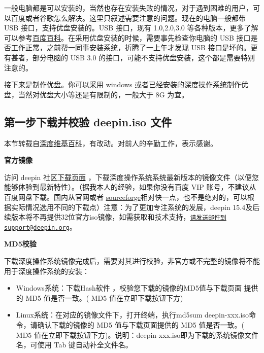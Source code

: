 \documentclass[doctor,openright,twoside]{sjtuthesis}
\providecommand{\tightlist}{%
    \setlength{\itemsep}{0pt}\setlength{\parskip}{0pt}}
\theoremstyle{plain}
\theoremstyle{definition}
\theoremstyle{remark}
\theoremstyle{ocrenumbox}
\theoremstyle{plain}
\begin{document}
一般电脑都是可以安装的，当然也存在安装失败的情况，对于遇到困难的用户，可以百度或者谷歌怎么解决。这里只叙述需要注意的问题。现在的电脑一般都带 USB 接口，支持优盘安装的。USB 接口，现有 1.0,2.0,3.0 等各种版本，更多了解可以参考\href{https://baike.baidu.com/item/USB\%E6\%8E\%A5\%E5\%8F\%A3/493294?fr=aladdin}{百度百科}。在采用优盘安装的时候，需要事先检查你电脑的 USB 接口是否工作正常，之前帮一同事安装系统，折腾了一上午才发现 USB 接口是坏的。更有甚者，部分电脑的 USB 3.0 的接口，可能不支持优盘安装，这个都是需要特别注意的。

接下来是制作优盘。你可以采用 windows 或者已经安装的深度操作系统制作优盘，当然对优盘大小等还是有限制的，一般大于 8G 为宜。

\hypertarget{deepin.iso-}{%
\subsection{第一步下载并校验 deepin.iso 文件}\label{deepin.iso-}}

本节转载自\href{https://wiki.deepin.org/index.php?title=\%E5\%8E\%9F\%E7\%94\%9F\%E5\%AE\%89\%E8\%A3\%85}{深度维基百科}，有改动。对前人的辛勤工作，表示感谢。

\textbf{官方镜像}

访问 deepin 社区\href{https://www.deepin.org/download/}{下载页面} ，下载深度操作系统系统最新版本的镜像文件（以便您能够体验到最新特性）。（据我本人的经验，如果你没有百度 VIP 账号，不建议从百度网盘下载。国内从官网或者 \href{https://sourceforge.net/projects/deepin/}{sourceforge}相对快一点，也不是绝对的，可以根据实际情况选用不同的下载点）注意：为了更加专注系统的发展，deepin 15.4及后续版本将不再提供32位官方iso镜像，如需获取和技术支持，\href{mailto:请发送邮件到support@deepin.org}{\nolinkurl{请发送邮件到support@deepin.org}}。

\textbf{MD5校验}

下载深度操作系统镜像完成后，需要对其进行校验，非官方或不完整的镜像将不能用于深度操作系统的安装：

\begin{itemize}
\tightlist
\item
  Windows系统：下载Hash软件 ，校验您下载的镜像的MD5值与下载页面 提供的 MD5 值是否一致。( MD5 值在立即下载按钮下方)
\item
  Linux系统：在对应的镜像文件下，打开终端，执行md5sum deepin-xxx.iso命令，请确认下载的镜像的 MD5 值与下载页面提供的 MD5 值是否一致。( MD5 值在立即下载按钮下方)。说明：deepin-xxx.iso即为下载的系统镜像文件名，可使用 Tab 键自动补全文件名。
\end{itemize}
\end{document}
